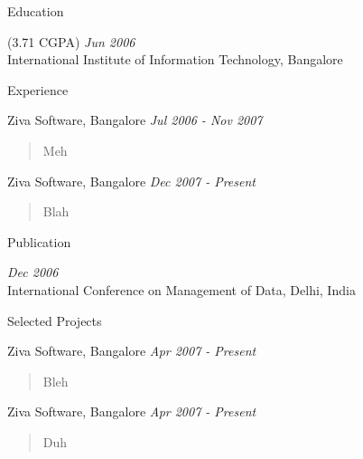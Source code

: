 \documentclass{resume}
\author{Siddhartha Reddy Kothakapu}
\newcommand{\period}{\hfill\small\sl}
\begin{document}
\maketitle

\begin{category}{Education}

     {\footnotesize(3.71 CGPA)} {\period Jun 2006}\\
    International Institute of Information Technology, Bangalore

\end{category}


\begin{category}{Experience}

     Ziva Software, Bangalore {\period Jul 2006 - Nov 2007}
    \begin{quote}
        Meh
    \end{quote}

     Ziva Software, Bangalore {\period Dec 2007 - Present}
    \begin{quote}
        Blah
    \end{quote}

\end{category}


\begin{category}{Publication}

     {\period Dec 2006}\\
    International Conference on Management of Data, Delhi, India

\end{category}


\begin{category}{Selected Projects}

     Ziva Software, Bangalore {\period Apr 2007 - Present}
     \begin{quote}
        Bleh
    \end{quote}

     Ziva Software, Bangalore {\period Apr 2007 - Present}
     \begin{quote}
        Duh
    \end{quote}

\end{category}
\end{document}
